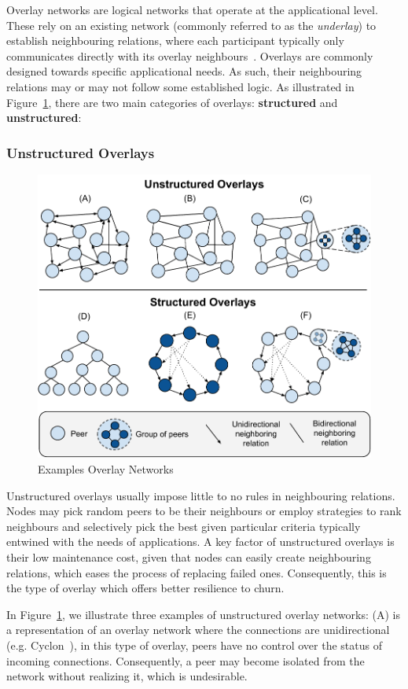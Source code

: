 Overlay networks are logical networks that operate at the applicational level. These rely on an existing network (commonly referred to as the \textit{underlay}) to establish neighbouring relations, where each participant typically only communicates directly with its overlay neighbours~\cite{leitaoPHDthesis}. Overlays are commonly designed towards specific applicational needs. As such, their neighbouring relations may or may not follow some established logic. As illustrated in Figure~\ref{fig:overlay_networks}, there are two main categories of overlays: \textbf{structured} and \textbf{unstructured}:

\subsubsection*{Unstructured Overlays}

\begin{figure}
    \centering
    \includegraphics[width=0.60\linewidth]{Chapters/Figures/overlay_networks.pdf}
    \caption{Examples Overlay Networks}
    \label{fig:overlay_networks}
\end{figure}

Unstructured overlays usually impose little to no rules in neighbouring relations. Nodes may pick random peers to be their neighbours or employ strategies to rank neighbours and selectively pick the best given particular criteria typically entwined with the needs of applications. A key factor of unstructured overlays is their low maintenance cost, given that nodes can easily create neighbouring relations, which eases the process of replacing failed ones. Consequently, this is the type of overlay which offers better resilience to churn.

In Figure~\ref{fig:overlay_networks}, we illustrate three examples of unstructured overlay networks: (A) is a representation of an overlay network where the connections are unidirectional (e.g. Cyclon~\cite{cyclon}), in this type of overlay, peers have no control over the status of incoming connections. Consequently, a peer may become isolated from the network without realizing it, which is undesirable. 

